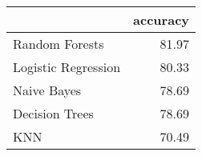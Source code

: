 \begin{tabular}{lr}
\toprule
{} &  accuracy \\
\midrule
Random Forests      &     81.97 \\
Logistic Regression &     80.33 \\
Naive Bayes         &     78.69 \\
Decision Trees      &     78.69 \\
KNN                 &     70.49 \\
\bottomrule
\end{tabular}

